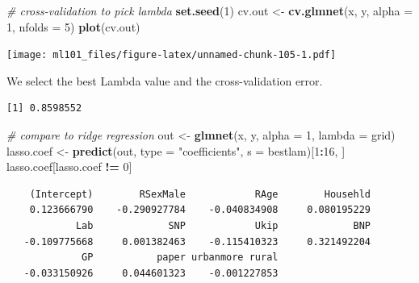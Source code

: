 \documentclass[]{article}
\newenvironment{Shaded}{\begin{snugshade}}{\end{snugshade}}
\newcommand{\CommentTok}[1]{\textcolor[rgb]{0.56,0.35,0.01}{\textit{#1}}}
\newcommand{\DataTypeTok}[1]{\textcolor[rgb]{0.13,0.29,0.53}{#1}}
\newcommand{\DecValTok}[1]{\textcolor[rgb]{0.00,0.00,0.81}{#1}}
\newcommand{\KeywordTok}[1]{\textcolor[rgb]{0.13,0.29,0.53}{\textbf{#1}}}
\newcommand{\NormalTok}[1]{#1}
\newcommand{\OperatorTok}[1]{\textcolor[rgb]{0.81,0.36,0.00}{\textbf{#1}}}
\newcommand{\StringTok}[1]{\textcolor[rgb]{0.31,0.60,0.02}{#1}}
\begin{document}
\begin{Shaded}
\begin{Highlighting}[]
\CommentTok{# cross-validation to pick lambda}
\KeywordTok{set.seed}\NormalTok{(}\DecValTok{1}\NormalTok{)}
\NormalTok{cv.out <-}\StringTok{ }\KeywordTok{cv.glmnet}\NormalTok{(x, y, }\DataTypeTok{alpha =} \DecValTok{1}\NormalTok{, }\DataTypeTok{nfolds =} \DecValTok{5}\NormalTok{)}
\KeywordTok{plot}\NormalTok{(cv.out)}
\end{Highlighting}
\end{Shaded}

\texttt{[image: ml101\_files/figure-latex/unnamed-chunk-105-1.pdf]}

We select the best Lambda value and the cross-validation error.

\begin{Shaded}
\end{Shaded}

\begin{verbatim}
[1] 0.8598552
\end{verbatim}

\begin{Shaded}
\begin{Highlighting}[]
\CommentTok{# compare to ridge regression}
\NormalTok{out <-}\StringTok{ }\KeywordTok{glmnet}\NormalTok{(x, y, }\DataTypeTok{alpha =} \DecValTok{1}\NormalTok{, }\DataTypeTok{lambda =}\NormalTok{ grid)}
\NormalTok{lasso.coef <-}\StringTok{ }\KeywordTok{predict}\NormalTok{(out, }\DataTypeTok{type =} \StringTok{"coefficients"}\NormalTok{, }\DataTypeTok{s =}\NormalTok{ bestlam)[}\DecValTok{1}\OperatorTok{:}\DecValTok{16}\NormalTok{, ]}
\NormalTok{lasso.coef[lasso.coef }\OperatorTok{!=}\StringTok{ }\DecValTok{0}\NormalTok{]}
\end{Highlighting}
\end{Shaded}

\begin{verbatim}
    (Intercept)        RSexMale            RAge        Househld 
    0.123666790    -0.290927784    -0.040834908     0.080195229 
            Lab             SNP            Ukip             BNP 
   -0.109775668     0.001382463    -0.115410323     0.321492204 
             GP           paper urbanmore rural 
   -0.033150926     0.044601323    -0.001227853 
\end{verbatim}
\end{document}
